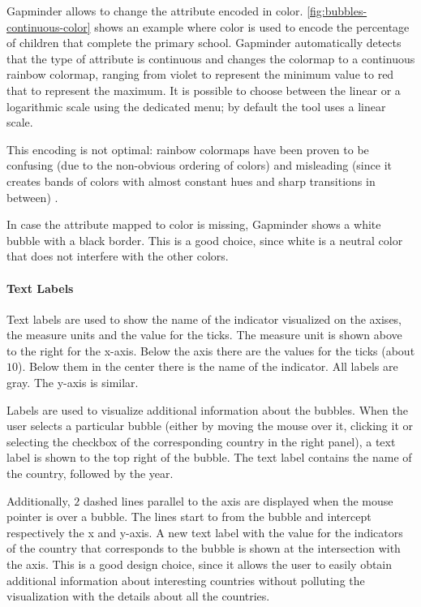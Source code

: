 Gapminder allows to change the attribute encoded in color.
\cref{fig:bubbles-continuous-color} shows an example where color is used to encode the percentage of children that complete the primary school.
Gapminder automatically detects that the type of attribute is continuous and changes the colormap to a continuous rainbow colormap, ranging from violet to represent the minimum value to red that to represent the maximum. It is possible to choose between the linear or a logarithmic scale using the dedicated menu; by default the tool uses a linear scale.

This encoding is not optimal:
rainbow colormaps have been proven to be confusing (due to the non-obvious ordering of colors) and misleading (since it creates bands of colors with almost constant hues and sharp transitions in between) \cite{color-maps}.

In case the attribute mapped to color is missing, Gapminder shows a white bubble with a black border.
This is a good choice, since white is a neutral color that does not interfere with the other colors.

\paragraph{Text Labels}
Text labels are used to show the name of the indicator visualized on the axises, the measure units and the value for the ticks.
The measure unit is shown above to the right for the x-axis.
Below the axis there are the values for the ticks (about $10$).
Below them in the center there is the name of the indicator.
All labels are gray.
The y-axis is similar.

Labels are used to visualize additional information about the bubbles.
When the user selects a particular bubble (either by moving the mouse over it, clicking it or selecting the checkbox of the corresponding country in the right panel), a text label is shown to the top right of the bubble.
The text label contains the name of the country, followed by the year.

Additionally, $2$ dashed lines parallel to the axis are displayed when the mouse pointer is over a bubble.
The lines start to from the bubble and intercept respectively the x and y-axis.
A new text label with the value for the indicators of the country that corresponds to the bubble is shown at the intersection with the axis.
This is a good design choice, since it allows the user to easily obtain additional information about interesting countries without polluting the visualization with the details about all the countries.

